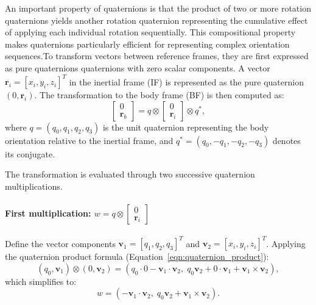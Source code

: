 



An important property of quaternions is that the product of two or more rotation quaternions yields another rotation quaternion representing the cumulative effect of applying each individual rotation sequentially. This compositional property makes quaternions particularly efficient for representing complex orientation sequences.To transform vectors between reference frames, they are first expressed as pure quaternions quaternions with zero scalar components. A vector $\bm{r}_i = [x_i, y_i, z_i]^T$ in the inertial frame (IF) is represented as the pure quaternion $(0, \bm{r}_i)$. The transformation to the body frame (BF) is then computed as:
\begin{equation}
\begin{bmatrix} 0 \\ \bm{r}_b \end{bmatrix} 
= q \otimes \begin{bmatrix} 0 \\ \bm{r}_i \end{bmatrix} \otimes q^*,
\label{eqn:quaternion_frame_transform}
\end{equation}
where $q = (q_0, q_1, q_2, q_3)$ is the unit quaternion representing the body orientation relative to the inertial frame, and $q^* = (q_0, -q_1, -q_2, -q_3)$ denotes its conjugate.


The transformation is evaluated through two successive quaternion multiplications.

\paragraph{First multiplication: $w = q \otimes \begin{bmatrix} 0 \\ \bm{r}_i \end{bmatrix}$}

Define the vector components $\bm{v}_1 = [q_1, q_2, q_3]^T$ and $\bm{v}_2 = [x_i, y_i, z_i]^T$. Applying the quaternion product formula (Equation~\ref{eqn:quaternion_product}):
\begin{equation}
(q_0, \bm{v}_1) \otimes (0, \bm{v}_2) = (q_0 \cdot 0 - \bm{v}_1 \cdot \bm{v}_2, \; q_0\bm{v}_2 + 0 \cdot \bm{v}_1 + \bm{v}_1 \times \bm{v}_2),
\end{equation}
which simplifies to:
\begin{equation}
w = (-\bm{v}_1 \cdot \bm{v}_2, \; q_0\bm{v}_2 + \bm{v}_1 \times \bm{v}_2).
\end{equation}

